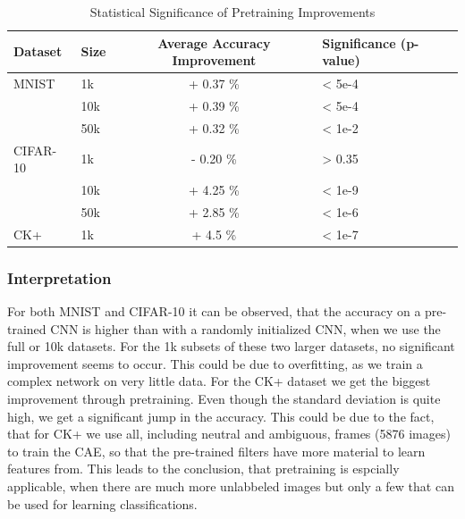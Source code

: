\documentclass[draft]{article}
\begin{document}
    \begin{table}
      \caption{Statistical Significance of Pretraining Improvements}
      \label{table:significance}
      \centering
      \begin{tabular}{llcl}
        \toprule
        Dataset     & Size    & Average Accuracy Improvement & Significance (p-value) \\
        \midrule
        MNIST & 1k    & + 0.37 \%  & < 5e-4 \\
              & 10k   & + 0.39 \%  & < 5e-4 \\
              & 50k   & + 0.32 \%  & < 1e-2 \\
        \midrule
        CIFAR-10  & 1k    & - 0.20 \% & > 0.35\\
                  & 10k   & + 4.25 \% & < 1e-9\\
                  & 50k   & + 2.85 \% & < 1e-6\\
        \midrule
        CK+     & 1k & + 4.5 \%      & < 1e-7 \\
        \bottomrule
      \end{tabular}
    \end{table}

    \subsubsection{Interpretation}
      For both MNIST and CIFAR-10 it can be observed, that the accuracy on a pre-trained CNN is higher than with a randomly initialized CNN, when we use the full or 10k datasets.
      For the 1k subsets of these two larger datasets, no significant improvement seems to occur. This could be due to overfitting, as we train a complex network on very little data.
      For the CK+ dataset we get the biggest improvement through pretraining.
      Even though the standard deviation is quite high, we get a significant jump in the accuracy.
      This could be due to the fact, that for CK+ we use all, including neutral and ambiguous, frames (5876 images) to train the CAE, so that the pre-trained filters have more material to learn features from.
      This leads to the conclusion, that pretraining is espcially applicable, when there are much more unlabbeled images but only a few that can be used for learning classifications.
\end{document}
